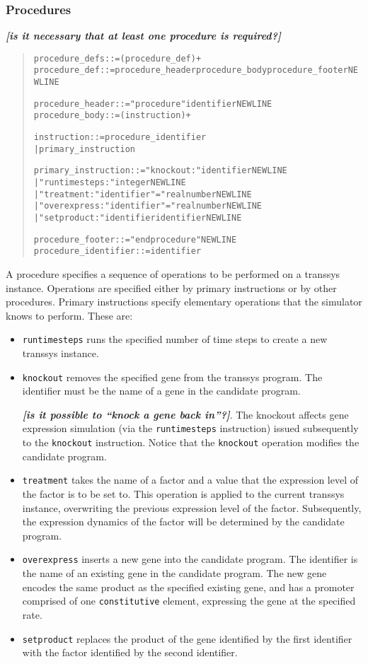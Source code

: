 \documentclass[a4paper,fleqn]{article}
\newcommand{\computercode}[1]{\texttt{#1}}
\newcommand{\todo}[1]{\rule{0pt}{0pt}\marginpar{\rule{1ex}{1ex}}\textbf{\emph{[#1]}}}
\newenvironment{ebnfrule}{\begin{footnotesize}\begin{quote}\begin{alltt}}{\end{alltt}\end{quote}\end{footnotesize}}
\begin{document}
\subsubsection{Procedures}
\label{section_procedures}

\todo{is it necessary that at least one procedure is required?}

\begin{ebnfrule}
procedure_defs ::= (procedure_def)+
procedure_def ::= procedure_header procedure_body procedure_footer NEWLINE

procedure_header ::= "procedure" identifier NEWLINE 
procedure_body ::= (instruction)+

instruction ::= procedure_identifier
	| primary_instruction

primary_instruction ::= "knockout:" identifier NEWLINE
	| "runtimesteps:" integer NEWLINE
	| "treatment:" identifier "=" realnumber NEWLINE
	| "overexpress:" identifier "=" realnumber NEWLINE
        | "setproduct:" identifier identifier NEWLINE

procedure_footer ::= "endprocedure" NEWLINE
procedure_identifier ::= identifier
\end{ebnfrule}
A procedure specifies a sequence of operations to be performed on a
transsys instance. Operations are specified either by primary
instructions or by other procedures. Primary instructions specify
elementary operations that the simulator knows to perform. These are:
\begin{itemize}
\item \computercode{runtimesteps} runs the specified number of time
  steps to create a new transsys instance.
\item \computercode{knockout} removes the specified gene from the
  transsys program. The identifier must be the name of a gene in the
  candidate program. \todo{is it possible to ``knock a gene back
    in''?}. The knockout affects gene expression simulation (via the
  \computercode{runtimesteps} instruction) issued subsequently to the
  \computercode{knockout} instruction. Notice that the
  \computercode{knockout} operation modifies the candidate program.
\item \computercode{treatment} takes the name of a factor and a value
  that the expression level of the factor is to be set to. This
  operation is applied to the current transsys instance, overwriting
  the previous expression level of the factor. Subsequently, the
  expression dynamics of the factor will be determined by the
  candidate program.
\item \computercode{overexpress} inserts a new gene into the candidate
  program. The identifier is the name of an existing gene in the
  candidate program. The new gene encodes the same product as the
  specified existing gene, and has a promoter comprised of one
  \computercode{constitutive} element, expressing the gene at the
  specified rate.
\item \computercode{setproduct} replaces the product of the gene
  identified by the first identifier with the factor identified by the
  second identifier.
\end{itemize}
\end{document}
